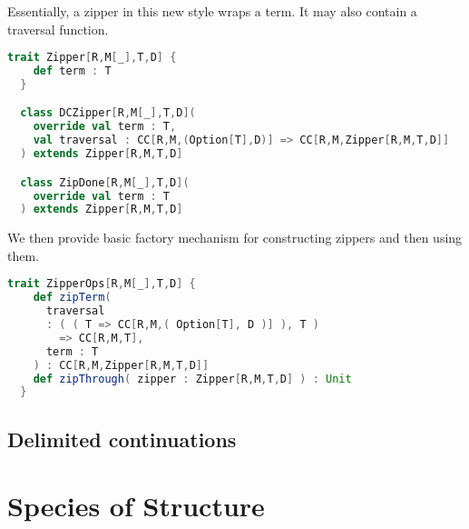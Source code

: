 Essentially, a zipper in this new style wraps a term. It may also
contain a traversal function.

\begin{lstlisting}[language=Scala,mathescape=true]  
  trait Zipper[R,M[_],T,D] {
    def term : T
  }

  class DCZipper[R,M[_],T,D](
    override val term : T,
    val traversal : CC[R,M,(Option[T],D)] => CC[R,M,Zipper[R,M,T,D]]
  ) extends Zipper[R,M,T,D]

  class ZipDone[R,M[_],T,D](
    override val term : T
  ) extends Zipper[R,M,T,D]
\end{lstlisting}

\break

We then provide basic factory mechanism for constructing zippers and
then using them.

\begin{lstlisting}[language=Scala,mathescape=true]
  trait ZipperOps[R,M[_],T,D] {
    def zipTerm(
      traversal
      : ( ( T => CC[R,M,( Option[T], D )] ), T )
        => CC[R,M,T],
      term : T
    ) : CC[R,M,Zipper[R,M,T,D]]
    def zipThrough( zipper : Zipper[R,M,T,D] ) : Unit
  }
\end{lstlisting}

\subsection{Delimited continuations}

\section{Species of Structure}